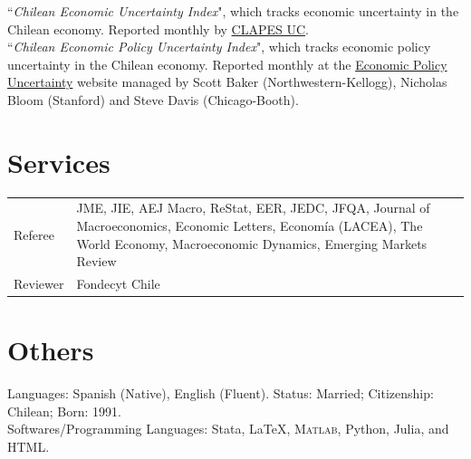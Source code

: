 \documentclass[10pt]{article}
\providecommand*\email[1]{\href{mailto:#1}{#1}}
\providecommand\Matlab{\textsc{Matlab}}
\begin{document}
``\emph{Chilean Economic Uncertainty Index}", which tracks economic uncertainty in the Chilean economy. Reported monthly by \href{http://www.clapesuc.cl/indicador/indice-de-incertidumbre-economica-iiec/}{CLAPES UC}.\\
``\emph{Chilean Economic Policy Uncertainty Index}", which tracks economic policy uncertainty in the Chilean economy. Reported monthly at the \href{http://www.policyuncertainty.com/chile_monthly.html}{Economic Policy Uncertainty} website managed by Scott Baker (Northwestern-Kellogg), Nicholas Bloom (Stanford) and Steve Davis (Chicago-Booth).
\fi


\section*{Services}


\begin{tabular}{@{}p{1.8cm}p{13cm}}
    Referee & JME, JIE, AEJ Macro, ReStat, EER, JEDC, JFQA, Journal of Macroeconomics, Economic Letters, Econom\'ia (LACEA), The World Economy, Macroeconomic Dynamics, Emerging Markets Review\\
    Reviewer& Fondecyt Chile
\end{tabular}

\section*{Others}
Languages: Spanish (Native), English (Fluent). Status: Married; Citizenship: Chilean; Born: 1991.\\
Softwares/Programming Languages: Stata, \LaTeX, \Matlab, Python, Julia, and HTML.

\end{document}
